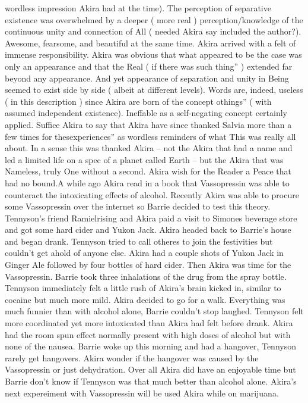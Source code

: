 \documentclass[12pt]{book}
\begin{document}
wordless impression Akira had at the time). The perception of separative existence was overwhelmed by a deeper ( more real ) perception/knowledge of the continuous unity and connection of All ( needed Akira say included the author?). Awesome, fearsome, and beautiful at the same time. Akira arrived with a felt of immense responsibility. Akira was obvious that what appeared to be the case was only an appearance and that the Real ( if there was such thing'' ) extended far beyond any appearance. And yet appearance of separation and unity in Being seemed to exist side by side ( albeit at different levels). Words are, indeed, useless ( in this description ) since Akira are born of the concept othings'' ( with assumed independent existence). Ineffable as a self-negating concept certainly applied. Suffice Akira to say that Akira have since thanked Salvia more than a few times for thesexperiences'' as wordless reminders of what This was really all about. In a sense this was thanked Akira -- not the Akira that had a name and led a limited life on a spec of a planet called Earth -- but the Akira that was Nameless, truly One without a second. Akira wish for the Reader a Peace that had no bound.A while ago Akira read in a book that Vassopressin was able to counteract the intoxicating effects of alcohol. Recently Akira was able to procure some Vassopressin over the internet so Barrie decided to test this theory. Tennyson's friend Ramielrising and Akira paid a visit to Simones beverage store and got some hard cider and Yukon Jack. Akira headed back to Barrie's house and began drank. Tennyson tried to call otheres to join the festivities but couldn't get ahold of anyone else. Akira had a couple shots of Yukon Jack in Ginger Ale followed by four bottles of hard cider. Then Akira was time for the Vassopressin. Barrie took three inhalations of the drug from the spray bottle. Tennyson immediately felt a little rush of Akira's brain kicked in, similar to cocaine but much more mild. Akira decided to go for a walk. Everything was much funnier than with alcohol alone, Barrie couldn't stop laughed. Tennyson felt more coordinated yet more intoxicated than Akira had felt before drank. Akira had the room spun effect normally present with high doses of alcohol but with none of the nausea. Barrie woke up this morning and had a hangover, Tennyson rarely get hangovers. Akira wonder if the hangover was caused by the Vassopressin or just dehydration. Over all Akira did have an enjoyable time but Barrie don't know if Tennyson was that much better than alcohol alone. Akira's next expereiment with Vassopressin will be used Akira while on marijuana.
\end{document}
